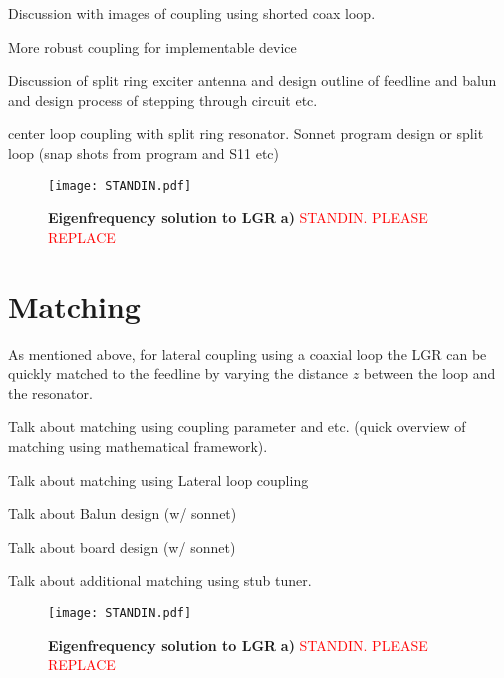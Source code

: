 Discussion with images of coupling using shorted coax loop.

More robust coupling for implementable device

Discussion of split ring exciter antenna and design outline of feedline and balun and design process of stepping through circuit etc.

center loop coupling with split ring resonator. Sonnet program design or split loop (snap shots from program and S11 etc) 

\begin{figure}[t!]
\centering
\texttt{[image: STANDIN.pdf]}  
\caption{\textbf{Eigenfrequency solution to LGR} \textbf{a)} \textcolor{red} {STANDIN. PLEASE REPLACE}}
\label{LGR_Eigen}
\end{figure}


\section{Matching}

As mentioned above, for lateral coupling using a coaxial loop the LGR can be quickly matched to the feedline by varying the distance $z$ between the loop and the resonator. 






Talk about matching using coupling parameter and etc. (quick overview of matching using mathematical framework).

Talk about matching using Lateral loop coupling

Talk about Balun design (w/ sonnet)

Talk about board design (w/ sonnet)

Talk about additional matching using stub tuner.


\begin{figure}[h!]
\centering
\texttt{[image: STANDIN.pdf]}  
\caption{\textbf{Eigenfrequency solution to LGR} \textbf{a)} \textcolor{red} {STANDIN. PLEASE REPLACE}}
\label{LGR_Eigen}
\end{figure}



